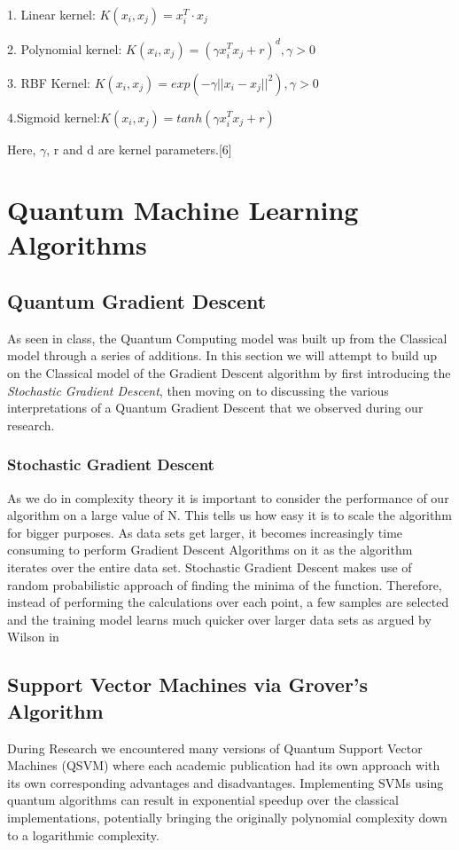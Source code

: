 \documentclass[hidelinks,11pt]{article}
\begin{document}
	1. Linear kernel: $K (x_i , x_j) = x_i^T\cdot x_j$ 

	2. Polynomial kernel: $K (x_i , x_j) = (\gamma x_i^T x_j + r)^d , \gamma > 0$ 

	3. RBF Kernel: $ K (x_i , x_j) = exp(-\gamma ||x_i - x_j||^2) , \gamma > 0$

	4.Sigmoid kernel:$ K (x_i , x_j) = tanh(\gamma x_i^T x_j + r)$  

	Here, $\gamma$, r and d are kernel parameters.[6]

\newpage
\section{Quantum Machine Learning Algorithms}
\subsection{Quantum Gradient Descent}
As seen in class, the Quantum Computing model was built up from the Classical model through a series of additions. In this section we will attempt to build up on the Classical model  of the Gradient Descent algorithm by first introducing the \textit{Stochastic Gradient Descent}, then moving on to discussing the various interpretations of a Quantum Gradient Descent that we observed during our research. 
\subsubsection{Stochastic Gradient Descent}
As we do in complexity theory it is important to consider the performance of our algorithm on a large value of N. This tells us how easy it is to scale the algorithm for bigger purposes. As data sets get larger, it becomes increasingly time consuming to perform Gradient Descent Algorithms on it as the algorithm iterates over the entire data set. Stochastic Gradient Descent makes use of random probabilistic approach of finding the minima of the function. Therefore, instead of performing the calculations over each point, a few samples are selected and the training model learns much quicker over larger data sets as argued by Wilson in \cite {BOOK:4}\cite {BOOK:5}

\subsection{Support Vector Machines via Grover's Algorithm}
During Research we encountered many versions of Quantum Support Vector Machines (QSVM) where each academic publication had its own approach with its own corresponding advantages and disadvantages. Implementing SVMs using quantum algorithms can result in exponential speedup over the classical implementations, potentially bringing the originally polynomial complexity down to a logarithmic complexity. 
\end{document}
